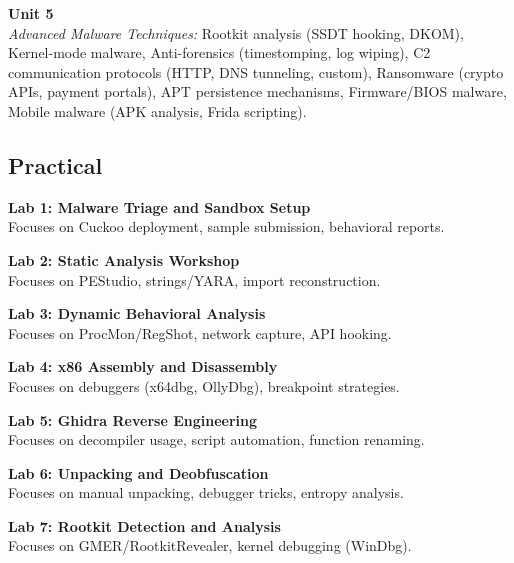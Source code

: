 \vspace{0.3cm}

\noindent\textbf{Unit 5} \\
\textit{Advanced Malware Techniques:} Rootkit analysis (SSDT hooking, DKOM), Kernel-mode malware, Anti-forensics (timestomping, log wiping), C2 communication protocols (HTTP, DNS tunneling, custom), Ransomware (crypto APIs, payment portals), APT persistence mechanisms, Firmware/BIOS malware, Mobile malware (APK analysis, Frida scripting).

\newpage

\subsection*{Practical}
\noindent\textbf{Lab 1: Malware Triage and Sandbox Setup} \\
Focuses on Cuckoo deployment, sample submission, behavioral reports.

\vspace{0.2cm}

\noindent\textbf{Lab 2: Static Analysis Workshop} \\
Focuses on PEStudio, strings/YARA, import reconstruction.

\vspace{0.2cm}

\noindent\textbf{Lab 3: Dynamic Behavioral Analysis} \\
Focuses on ProcMon/RegShot, network capture, API hooking.

\vspace{0.2cm}

\noindent\textbf{Lab 4: x86 Assembly and Disassembly} \\
Focuses on debuggers (x64dbg, OllyDbg), breakpoint strategies.

\vspace{0.2cm}

\noindent\textbf{Lab 5: Ghidra Reverse Engineering} \\
Focuses on decompiler usage, script automation, function renaming.

\vspace{0.2cm}

\noindent\textbf{Lab 6: Unpacking and Deobfuscation} \\
Focuses on manual unpacking, debugger tricks, entropy analysis.

\vspace{0.2cm}

\noindent\textbf{Lab 7: Rootkit Detection and Analysis} \\
Focuses on GMER/RootkitRevealer, kernel debugging (WinDbg).

